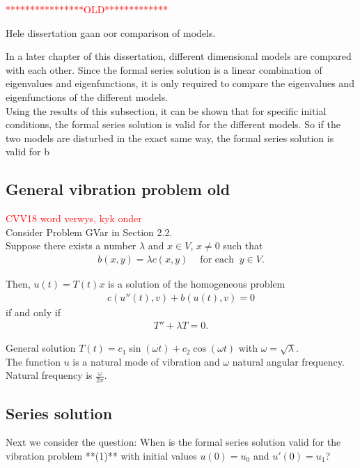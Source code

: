 \documentclass[../../main.tex]{subfiles}
\begin{document}
\textcolor{red}{****************OLD*************}

Hele dissertation gaan oor comparison of models.


In a later chapter of this dissertation, different dimensional models are compared with each other. Since the formal series solution is a linear combination of eigenvalues and eigenfunctions, it is only required to compare the eigenvalues and eigenfunctions of the different models.\\

Using the results of this subsection, it can be shown that for specific initial conditions, the formal series solution is valid for the different models. So if the two models are disturbed in the exact same way, the formal series solution is valid for b


\subsection{General vibration problem old}

\textcolor{red}{CVV18 word verwys, kyk onder}\\

Consider Problem GVar in Section 2.2.\\

Suppose there exists a number $\lambda$ and $x \in V$, $x \neq 0$ such that
\begin{eqnarray*}
	b(x,y) = \lambda c(x,y) \ \ \ \ \textrm{ for each } \ y \in V.
\end{eqnarray*}

Then, $u(t) = T(t)x$ is a solution of the homogeneous problem
\begin{eqnarray*}
	c(u''(t),v) + b(u(t),v) = 0
\end{eqnarray*}
if and only if
\begin{eqnarray}
	T''  + \lambda T = 0.
\end{eqnarray}

General solution $T(t) = c_1 \sin(\omega t) + c_2 \cos(\omega t)$ with $\omega = \sqrt{\lambda}$.\\

The function $u$ is a natural mode of vibration and $\omega$ natural angular frequency. Natural frequency is $\frac{\omega}{2 \pi}$.

\subsection*{Series solution}\label{ssec:existence:SeriesSolution}
Next we consider the question: When is the formal series solution valid for the vibration problem **(1)** with initial values $u(0) = u_0$ and $u'(0) = u_1$?\\
\end{document}
